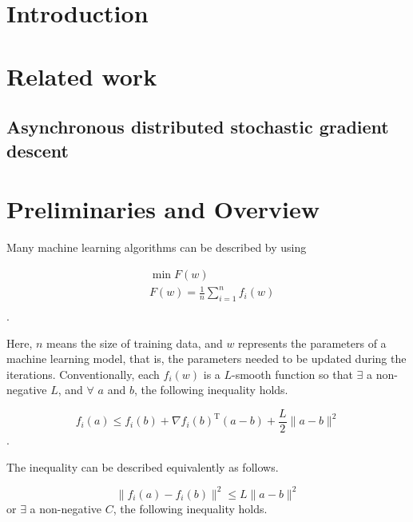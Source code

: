 \documentclass[10pt,journal,finalsubmission,compsoc]{IEEEtran}
\begin{document}
\IEEEpeerreviewmaketitle

\section{Introduction}
\label{introduction}






\section{Related work}
\label{related_work}




\subsection{Asynchronous distributed stochastic gradient descent}





\section{Preliminaries and Overview}
\label{overview}
Many machine learning algorithms can be described by using 

\begin{equation}
\label{equa_loss_minimization}
\begin{split}
 & \min F(w) \\
 & F(w)=\frac{1}{n}\sum\limits_{i=1}^n f_i(w)\\
\end{split}
\end{equation}.

Here, $n$ means the size of training data, and $w$ represents the parameters of a machine learning model, that is, the parameters needed to be updated during the iterations. Conventionally, each $f_i(w)$ is a $L$-smooth function so that $\exists$ a non-negative $L$, and $\forall$ $a$ and $b$, the following inequality holds.

\begin{equation}
\label{equa_l_smooth} 
f_i(a)\le f_i(b)+\nabla f_i(b)^\mathrm{T} (a-b)+\frac{L}{2}\parallel a-b\parallel^2
 \end{equation}.
 
The inequality can be described equivalently as follows.

\begin{equation}
\label{equa_l_smooth2} 
\parallel f_i(a)-f_i(b)\parallel^2\le L \parallel a-b\parallel^2
 \end{equation}
 or $\exists$ a non-negative $C$, the following inequality holds.
 
\end{document}
